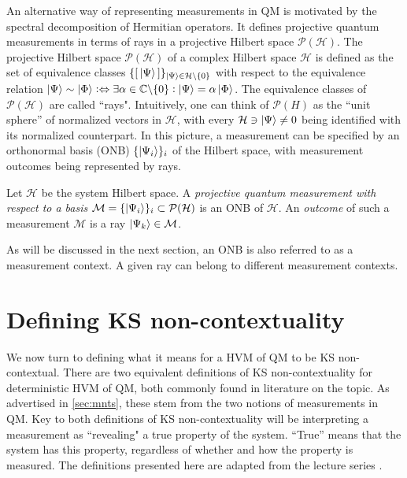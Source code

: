 An alternative way of representing measurements in QM is motivated by the spectral decomposition of Hermitian operators. It defines projective quantum measurements in terms of rays in a projective Hilbert space $\mathcal{P}(\mathcal{H})$. The projective Hilbert space $\mathcal{P}(\mathcal{H})$ of a complex Hilbert space $\mathcal{H}$ is defined as the set of equivalence classes $\{[\thinspace\ket{\Psi}\thinspace]\}_{\ket{\Psi} \in\mathcal{H}\backslash\{0\}}$ with respect to the equivalence relation $\ket{\Psi}\sim\ket{\Phi} \mathrel{\vcentcolon\Leftrightarrow}\exists\alpha\in\mathbb{C\backslash}\{0\}\vcentcolon\ket{\Psi} =\alpha\ket{\Phi}$. The equivalence classes of $\mathcal{P}(\mathcal{H})$ are called ``rays". Intuitively, one can think of $\mathcal{P}(H)$ as the ``unit sphere” of normalized vectors in $\mathcal{H}$, with every $\mathcal{H}\ni\ket{\Psi}\neq0$ being identified with its normalized counterpart. In this picture, a measurement can be specified by an orthonormal basis (ONB) $\{\ket{\Psi_{i}} \}_{i}$ of the Hilbert space, with measurement outcomes being represented by rays.

\begin{definition}
\label{def:projmntsbasis}
Let $\mathcal{H}$ be the system Hilbert space.\hfill\break
A \emph{projective quantum measurement with respect to a basis} $\mathcal{M}=\{\ket{\Psi_{i}} \}_{i}\subset\mathcal{\mathcal{P}}(\mathcal{H})$ is an ONB of $\mathcal{H}$. An \emph{outcome} of such a measurement $\mathcal{M}$ is a ray $\ket{\Psi_{k}} \in\mathcal{M}$.
\end{definition}

As will be discussed in the next section, an ONB is also referred to as a measurement context. A given ray can belong to different measurement contexts.

\section{Defining KS non-contextuality}
\label{sec:kscont}
We now turn to defining what it means for a HVM of QM to be KS non-contextual. There are two equivalent definitions of KS non-contextuality for deterministic HVM of QM, both commonly found in literature on the topic. As advertised in \ref{sec:mnts}, these stem from the two notions of measurements in QM. Key to both definitions of KS non-contextuality will be interpreting a measurement as ``revealing" a true property of the system. ``True” means that the system has this property, regardless of whether and how the property is measured. The definitions presented here are adapted from the lecture series \cite{Spekkens2012}.


